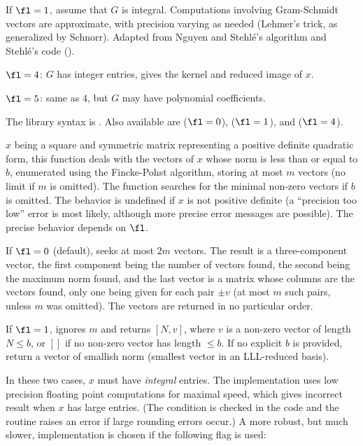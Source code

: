 If $\fl=1$, assume that $G$ is integral. Computations involving Gram-Schmidt
vectors are approximate, with precision varying as needed (Lehmer's trick,
as generalized by Schnorr). Adapted from Nguyen and Stehl\'e's algorithm
and Stehl\'e's code ().

$\fl=4$: $G$ has integer entries, gives the kernel and reduced image of $x$.

$\fl=5$: same as $4$, but $G$ may have polynomial coefficients.

The library syntax is .
Also available are  ($\fl=0$),
 ($\fl=1$), and 
($\fl=4$).

\label{se:qfminim}
$x$ being a square and symmetric matrix representing a positive definite
quadratic form, this function deals with the vectors of $x$ whose norm is
less than or equal to $b$, enumerated using the Fincke-Pohst algorithm,
storing at most $m$ vectors (no limit if $m$ is omitted). The function
searches for the minimal non-zero vectors if $b$ is omitted. The behavior is
undefined if $x$ is not positive definite (a ``precision too low'' error is
most likely, although more precise error messages are possible). The precise
behavior depends on $\fl$.

If $\fl=0$ (default), seeks at most $2m$ vectors. The result is a
three-component vector, the first component being the number of vectors
found, the second being the maximum norm found, and the last vector is a
matrix whose columns are the vectors found, only one being given for each
pair $\pm v$ (at most $m$ such pairs, unless $m$ was omitted). The vectors
are returned in no particular order.

If $\fl=1$, ignores $m$ and returns $[N,v]$, where $v$ is a non-zero vector
of length $N \leq b$, or $[]$ if no non-zero vector has length $\leq b$.
If no explicit $b$ is provided, return a vector of smallish norm
(smallest vector in an LLL-reduced basis).

In these two cases, $x$ must have \emph{integral} entries. The
implementation uses low precision floating point computations for maximal
speed, which gives incorrect result when $x$ has large entries. (The
condition is checked in the code and the routine raises an error if
large rounding errors occur.) A more robust, but much slower,
implementation is chosen if the following flag is used:

